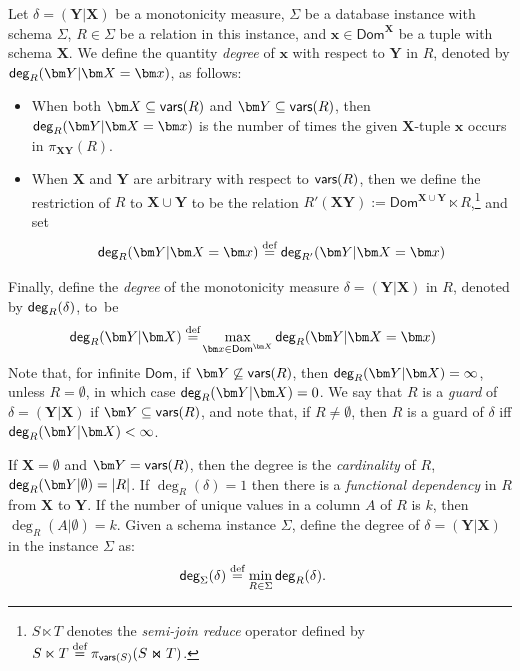 \documentclass[10pt,a4paper]{article}
\newcommand{\dom}{\textsf{Dom}}
\newcommand{\degree}{\text{\sf deg}}
\newcommand{\defeq}{\stackrel{\text{def}}{=}}
\newcommand{\vars}{\text{\sf vars}}
\begin{document}
Let $\delta = (\bm Y|\bm X)$ be a monotonicity measure,
$\Sigma$ be a database instance with schema $\Sigma$,
$R \in \Sigma$ be a relation in this instance,
and $\bm x \in \dom^{\bm X}$ be a tuple with schema $\bm X$.
We define the quantity {\em degree} of $\bm x$ with respect to $\bm Y$ in $R$, denoted by
$\degree_{R}(\bm Y | \bm X = \bm x)$, as follows:
\begin{itemize}
  \item When both $\bm X \subseteq \vars(R)$ and $\bm Y \subseteq \vars(R)$,
then $\degree_{R}(\bm Y|\bm X = \bm x)$ is the number of times the given
$\bm X$-tuple $\bm x$ occurs in $\pi_{\bm X\bm Y}(R)$.
  \item When $\bm X$ and $\bm Y$ are arbitrary with respect to $\vars(R)$, then we define
the restriction of $R$ to $\bm X \cup \bm Y$ to be the relation
$R'(\bm X\bm Y) := \dom^{\bm X \cup \bm Y} \ltimes R$,\footnote{$S \ltimes T$ denotes
the {\em semi-join reduce} operator defined by $S \ltimes T \defeq \pi_{\vars(S)}(S \Join T)$.} and set
  \[
\degree_{R}(\bm Y | \bm X = \bm x) \defeq \degree_{R'}(\bm Y | \bm X = \bm x)
  \]
\end{itemize}
Finally, define the {\em degree} of the monotonicity measure $\delta = (\bm Y|\bm X)$ in $R$,
denoted by $\degree_{R}(\delta)$, to~be
\begin{align}
    \degree_{R}(\bm Y|\bm X) \defeq & \max_{\bm x \in \dom^{\bm X}} \degree_{R}(\bm Y|\bm X = \bm x) \label{eq:degree:delta}
\end{align}
Note that, for infinite $\dom$, if $\bm Y \not\subseteq \vars(R)$, then $\degree_{R}(\bm Y|\bm X)=\infty$, unless
$R=\emptyset$, in which case $\degree_{R}(\bm Y|\bm X)=0$. We say that $R$ is a {\em guard}
of $\delta = (\bm Y|\bm X)$ if $\bm Y \subseteq \vars(R)$, and note that, if $R \neq
\emptyset$, then $R$ is a guard of $\delta$ iff $\degree_{R}(\bm Y|\bm X)< \infty$.

If $\bm X=\emptyset$ and $\bm Y = \vars(R)$, then the degree is the {\em cardinality} of
$R$, $\degree_{R}(\bm Y|\emptyset) = |R|$. If $\deg_R(\delta)=1$ then there is a {\em
functional dependency} in $R$ from $\bm X$ to $\bm Y$. If the number of unique values in a
column $A$ of $R$ is $k$, then $\deg_R(A|\emptyset)=k$. Given a schema instance $\Sigma$,
define the degree of $\delta = (\bm Y|\bm X)$ in the instance $\Sigma$ as:
%
\begin{align}
  \degree_{\Sigma}(\delta) &\defeq \min_{R \in \Sigma}\degree_{R}(\delta).
  \label{eqn:degree:sigma}
\end{align}
\end{document}

